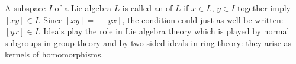 A subspace $I$ of a Lie algebra $L$ is called an  of $L$ if $x \in L$, $y \in I$ together imply $[xy] \in I$. Since $[xy] = -[yx]$, the condition could just as well be written: $[yx] \in I$. Ideals play the role in Lie algebra theory which is played by normal subgroups in group theory and by two-sided ideals in ring theory: they arise as kernels of homomorphisms.
